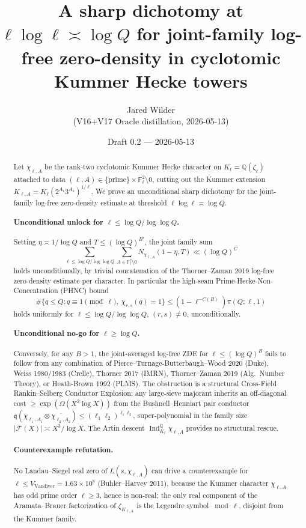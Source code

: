 \documentclass[11pt]{article}
\title{A sharp dichotomy at $\ell\log\ell\asymp\log Q$ for joint-family log-free zero-density in cyclotomic Kummer Hecke towers}
\author{Jared Wilder \\ \footnotesize{(V16+V17 Oracle distillation, 2026-05-13)}}
\date{Draft 0.2 --- 2026-05-13}
\newcommand{\Q}{\mathbb Q}
\newcommand{\F}{\mathbb F}
\newcommand{\Ind}{\operatorname{Ind}}
\begin{document}
\maketitle

\begin{abstract}
Let $\chi_{\ell,A}$ be the rank-two cyclotomic Kummer Hecke character on $K_\ell=\Q(\zeta_\ell)$ attached to data $(\ell,A)\in\{\text{prime}\}\times\F_\ell^2\setminus 0$, cutting out the Kummer extension $K_{\ell,A}=K_\ell(2^{A_1}3^{A_2})^{1/\ell}$.  We prove an unconditional sharp dichotomy for the joint-family log-free zero-density estimate at threshold $\ell\log\ell\asymp\log Q$.

\paragraph{Unconditional unlock for $\ell\le\log Q/\log\log Q$.}  Setting $\eta\asymp 1/\log Q$ and $T\le(\log Q)^{B'}$, the joint family sum
\[
\sum_{\ell\le\log Q/\log\log Q}\sum_{A\in\F_\ell^2\setminus 0}N_{\chi_{\ell,A}}(1-\eta,T)\ll(\log Q)^{C}
\]
holds unconditionally, by trivial concatenation of the Thorner--Zaman 2019 log-free zero-density estimate per character.  In particular the high-seam Prime-Hecke-Non-Concentration (PHNC) bound
\[
\#\{q\le Q:q\equiv 1\pmod\ell,\ \chi_{r,s}(q)=1\}\le(1-\ell^{-C(B)})\pi(Q;\ell,1)
\]
holds uniformly for $\ell\le\log Q/\log\log Q$, $(r,s)\ne 0$, unconditionally.

\paragraph{Unconditional no-go for $\ell\ge\log Q$.}  Conversely, for any $B>1$, the joint-averaged log-free ZDE for $\ell\le(\log Q)^B$ fails to follow from any combination of Pierce--Turnage-Butterbaugh--Wood 2020 (Duke), Weiss 1980/1983 (Crelle), Thorner 2017 (IMRN), Thorner--Zaman 2019 (Alg.\ Number Theory), or Heath-Brown 1992 (PLMS).  The obstruction is a structural Cross-Field Rankin--Selberg Conductor Explosion: any large-sieve majorant inherits an off-diagonal cost $\ge\exp(\Omega(X^2\log X))$ from the Bushnell--Henniart pair conductor $\mathfrak q(\chi_{\ell_1,A_1}\otimes\overline{\chi_{\ell_2,A_2}})\le(\ell_1\ell_2)^{\ell_1\ell_2}$, super-polynomial in the family size $|\mathcal F(X)|\asymp X^3/\log X$.  The Artin descent $\Ind_{K_\ell}^{\Q}\chi_{\ell,A}$ provides no structural rescue.

\paragraph{Counterexample refutation.}  No Landau--Siegel real zero of $L(s,\chi_{\ell,A})$ can drive a counterexample for $\ell\le V_{\mathrm{Vandiver}}=1.63\times 10^8$ (Buhler--Harvey 2011), because the Kummer character $\chi_{\ell,A}$ has odd prime order $\ell\ge 3$, hence is non-real; the only real component of the Aramata--Brauer factorization of $\zeta_{K_{\ell,A}}$ is the Legendre symbol $\bmod\ell$, disjoint from the Kummer family.
\end{abstract}
\end{document}
